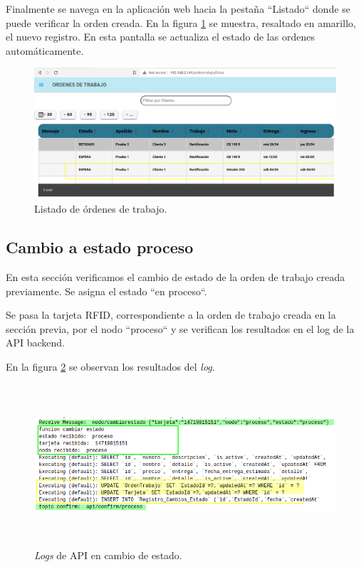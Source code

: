 Finalmente se navega en la aplicación web hacia la pestaña ``Listado`` donde se puede verificar la orden creada. En la figura \ref{fig:ensayolistado} se muestra, resaltado en amarillo, el nuevo registro. En esta pantalla se actualiza el estado de las ordenes automáticamente.

\begin{figure}[H]
	\centering
	\includegraphics[width=\textwidth]{./Figures/ensayo-1/11.listado.png}
	\caption{Listado de órdenes de trabajo.}
	\label{fig:ensayolistado}
\end{figure}

\subsection{Cambio a estado proceso}
\label{subsec:ensayoaproceso}

En esta sección verificamos el cambio de estado de la orden de trabajo creada previamente. Se asigna el estado ``en proceso``.

Se pasa la tarjeta RFID, correspondiente a la orden de trabajo creada en la sección previa, por el nodo ``proceso`` y se verifican los resultados en el log de la API backend.

En la figura \ref{fig:cambioestado-api-log} se observan los resultados del \textit{log}.

\begin{figure}[H]
	\centering
	\includegraphics[width=\textwidth, height=6cm]{./Figures/ensayo-1/12.cambioestado-api-log.png}
	\caption{\textit{Logs} de API en cambio de estado.}
	\label{fig:cambioestado-api-log}
\end{figure}

